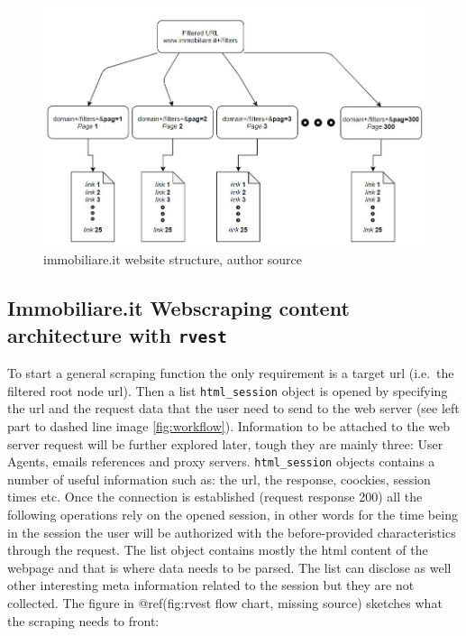 \documentclass[
  12pt,
  a4paper,
  oneside]{book}
\begin{document}
\begin{figure}
\hypertarget{fig:website_tree1}{%
\centering
\includegraphics{images/website_tree1.jpg}
\caption{immobiliare.it website structure, author source}\label{fig:website_tree1}
}
\end{figure}

\hypertarget{immobiliare.it-webscraping-content-architecture-with-rvest}{%
\subsection{\texorpdfstring{Immobiliare.it Webscraping content architecture with \texttt{rvest}}{Immobiliare.it Webscraping content architecture with rvest}}\label{immobiliare.it-webscraping-content-architecture-with-rvest}}

To start a general scraping function the only requirement is a target url (i.e.~the filtered root node url). Then a list \texttt{html\_session} object is opened by specifying the url and the request data that the user need to send to the web server (see left part to dashed line image \ref{fig:workflow}). Information to be attached to the web server request will be further explored later, tough they are mainly three: User Agents, emails references and proxy servers. \texttt{html\_session} objects contains a number of useful information such as: the url, the response, coockies, session times etc. Once the connection is established (request response 200) all the following operations rely on the opened session, in other words for the time being in the session the user will be authorized with the before-provided characteristics through the request.
The list object contains mostly the html content of the webpage and that is where data needs to be parsed. The list can disclose as well other interesting meta information related to the session but they are not collected.
The figure in @ref(fig:rvest flow chart, missing source) sketches what the scraping needs to front:
\end{document}
